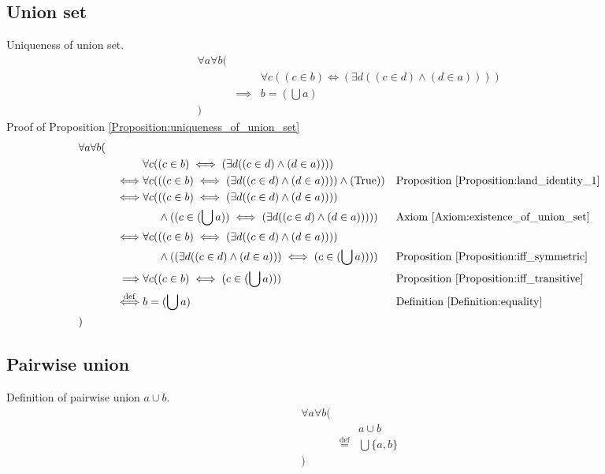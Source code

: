 \subsection{Union set}
\begin{prop}
\label{Proposition:uniqueness_of_union_set}
Uniqueness of union set.
\begin{align*}
& \forall a \forall b ( \\
& & & \forall c ((c \in b) \iff (\exists d ((c \in d) \land (d \in a)))) \\
& & \implies & b = (\bigcup a) \\
& )
\end{align*}
Proof of Proposition \ref{Proposition:uniqueness_of_union_set}
\begin{align*}
& \forall a \forall b ( \\
& & & \forall c ((c \in b) \iff (\exists d ((c \in d) \land (d \in a)))) \\
& & \iff & \forall c (((c \in b) \iff (\exists d ((c \in d) \land (d \in a)))) \land (\text{True}))
& & \text{Proposition \ref{Proposition:land_identity_1}} \\
& & \iff & \forall c (((c \in b) \iff (\exists d ((c \in d) \land (d \in a)))) \\
& & & \phantom{\forall c (} \land ((c \in (\bigcup a)) \iff (\exists d ((c \in d) \land (d \in a)))))
& & \text{Axiom \ref{Axiom:existence_of_union_set}} \\
& & \iff & \forall c (((c \in b) \iff (\exists d ((c \in d) \land (d \in a)))) \\
& & & \phantom{\forall c (} \land ((\exists d ((c \in d) \land (d \in a))) \iff (c \in (\bigcup a))))
& & \text{Proposition \ref{Proposition:iff_symmetric}} \\
& & \implies & \forall c ((c \in b) \iff (c \in (\bigcup a)))
& & \text{Proposition \ref{Proposition:iff_transitive}} \\
& & \overset{\operatorname{def}}{\iff} & b = (\bigcup a)
& & \text{Definition \ref{Definition:equality}} \\
& )
\end{align*}
\end{prop}

\subsection{Pairwise union}
\begin{defn}
\label{Definition:pairwise_union}
Definition of pairwise union $a \cup b$.
\begin{align*}
& \forall a \forall b ( \\
& & & a \cup b \\
& & \overset{\operatorname{def}}{=} & \bigcup \{ a , b \} \\
& )
\end{align*}
\end{defn}

